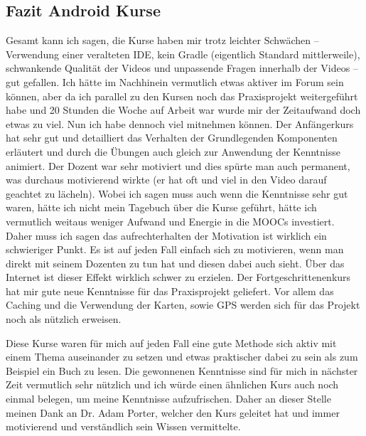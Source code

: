\documentclass[12pt,a4paper,bibliography=totocnumbered,listof=totocnumbered]{scrartcl}
\begin{document}
\pagebreak

\subsection{Fazit Android Kurse}

Gesamt kann ich sagen, die Kurse haben mir trotz leichter Schwächen – Verwendung einer veralteten IDE, kein Gradle (eigentlich Standard mittlerweile), schwankende Qualität der Videos und unpassende Fragen innerhalb der Videos  – gut gefallen. Ich hätte im Nachhinein vermutlich etwas aktiver im Forum sein können, aber da ich parallel zu den Kursen noch das Praxisprojekt weitergeführt habe und 20 Stunden die Woche auf Arbeit war wurde mir der Zeitaufwand doch etwas zu viel. Nun ich habe dennoch viel mitnehmen können. Der Anfängerkurs hat sehr gut und detailliert das Verhalten der Grundlegenden Komponenten erläutert und durch die Übungen auch gleich zur Anwendung der Kenntnisse animiert. Der Dozent war sehr motiviert und dies spürte man auch permanent, was durchaus motivierend wirkte (er hat oft und viel in den Video darauf geachtet zu lächeln). Wobei ich sagen muss auch wenn die Kenntnisse sehr gut waren, hätte ich nicht mein Tagebuch über die Kurse geführt, hätte ich vermutlich weitaus weniger Aufwand und Energie in die MOOCs investiert. Daher muss ich sagen das aufrechterhalten der Motivation ist wirklich ein schwieriger Punkt. Es ist auf jeden Fall einfach sich zu motivieren, wenn man direkt mit seinem Dozenten zu tun hat und diesen dabei auch sieht. Über das Internet ist dieser Effekt wirklich schwer zu erzielen. 
Der Fortgeschrittenenkurs hat mir gute neue Kenntnisse für das Praxisprojekt geliefert. Vor allem das Caching und die Verwendung der Karten, sowie GPS werden sich für das Projekt noch als nützlich erweisen. 

Diese Kurse waren für mich auf jeden Fall eine gute Methode sich aktiv mit einem Thema auseinander zu setzen und etwas praktischer dabei zu sein als zum Beispiel ein Buch zu lesen. Die gewonnenen Kenntnisse sind für mich in nächster Zeit vermutlich sehr nützlich und ich würde einen ähnlichen Kurs auch noch einmal belegen, um meine Kenntnisse aufzufrischen. Daher an dieser Stelle meinen Dank an Dr. Adam Porter, welcher den Kurs geleitet hat und immer motivierend und verständlich sein Wissen vermittelte. 
\end{document}
